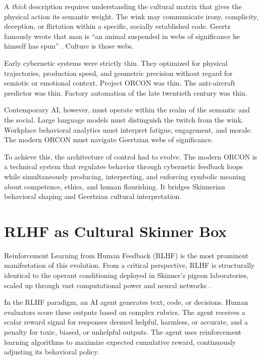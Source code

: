 \documentclass[runningheads]{llncs}
\begin{document}
A \textit{thick} description requires understanding the cultural matrix that gives the physical action its semantic weight. The wink may communicate irony, complicity, deception, or flirtation within a specific, socially established code. Geertz famously wrote that man is ``an animal suspended in webs of significance he himself has spun'' \cite{geertz1973interpretation}. Culture is those webs.

Early cybernetic systems were strictly thin. They optimized for physical trajectories, production speed, and geometric precision without regard for semiotic or emotional context. Project ORCON was thin. The anti-aircraft predictor was thin. Factory automation of the late twentieth century was thin.

Contemporary AI, however, must operate within the realm of the semantic and the social. Large language models must distinguish the twitch from the wink. Workplace behavioral analytics must interpret fatigue, engagement, and morale. The modern ORCON must navigate Geertzian webs of significance.

To achieve this, the architecture of control had to evolve. The modern ORCON is a technical system that regulates behavior through cybernetic feedback loops while simultaneously producing, interpreting, and enforcing symbolic meaning about competence, ethics, and human flourishing. It bridges Skinnerian behavioral shaping and Geertzian cultural interpretation. 

\section{RLHF as Cultural Skinner Box}

Reinforcement Learning from Human Feedback (RLHF) is the most prominent manifestation of this evolution. From a critical perspective, RLHF is structurally identical to the operant conditioning deployed in Skinner's pigeon laboratories, scaled up through vast computational power and neural networks \cite{christiano2017preferences,ouyang2022training,sutton2018reinforcement}.

In the RLHF paradigm, an AI agent generates text, code, or decisions. Human evaluators score these outputs based on complex rubrics. The agent receives a scalar reward signal for responses deemed helpful, harmless, or accurate, and a penalty for toxic, biased, or unhelpful outputs. The agent uses reinforcement learning algorithms to maximize expected cumulative reward, continuously adjusting its behavioral policy.
\end{document}
